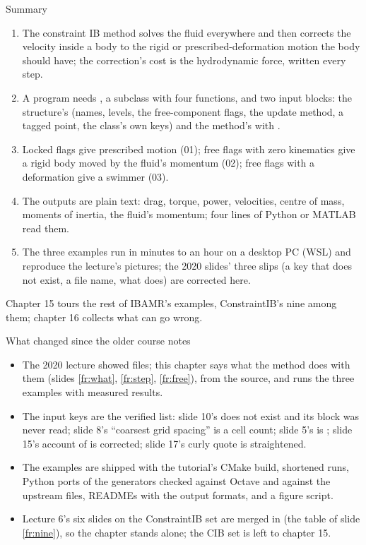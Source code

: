 \documentclass[aspectratio=169,11pt]{beamer}
\begin{document}
\begin{frame}{Summary}
\label{fr:summary}
\footnotesize
\begin{enumerate}
  \item The constraint IB method solves the fluid everywhere and then corrects the velocity inside a body to the rigid or prescribed-deformation motion the body should have; the correction's cost is the hydrodynamic force, written every step.
  \item A program needs , a  subclass with four functions, and two input blocks: the structure's (names, levels, the free-component flags, the update method, a tagged point, the class's own keys) and the method's with .
  \item Locked flags give prescribed motion (01); free flags with zero kinematics give a rigid body moved by the fluid's momentum (02); free flags with a deformation give a swimmer (03).
  \item The outputs are plain text: drag, torque, power, velocities, centre of mass, moments of inertia, the fluid's momentum; four lines of Python or MATLAB read them.
  \item The three examples run in minutes to an hour on a desktop PC (WSL) and reproduce the lecture's pictures; the 2020 slides' three slips (a key that does not exist, a file name, what  does) are corrected here.
\end{enumerate}
\begin{homebox}
\footnotesize Chapter 15 tours the rest of IBAMR's examples, ConstraintIB's nine among them; chapter 16 collects what can go wrong.
\end{homebox}
\end{frame}

\begin{frame}{What changed since the older course notes}
\label{fr:changed}
\footnotesize
\begin{itemize}
  \item The 2020 lecture showed files; this chapter says what the method does with them (slides \ref{fr:what}, \ref{fr:step}, \ref{fr:free}), from the source, and runs the three examples with measured results.
  \item The input keys are the verified list: slide 10's  does not exist and its block was never read; slide 8's ``coarsest grid spacing'' is a cell count; slide 5's  is ; slide 15's account of  is corrected; slide 17's curly quote is straightened.
  \item The examples are shipped with the tutorial's CMake build, shortened runs, Python ports of the generators checked against Octave and against the upstream files, READMEs with the output formats, and a figure script.
  \item Lecture 6's six slides on the ConstraintIB set are merged in (the table of slide \ref{fr:nine}), so the chapter stands alone; the CIB set is left to chapter 15.
\end{itemize}
\end{frame}
\end{document}
